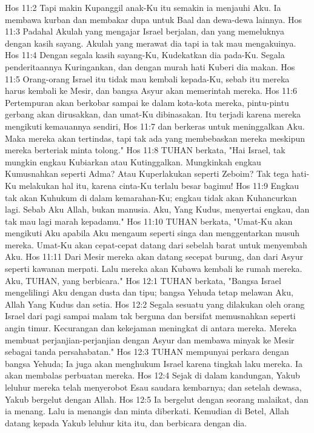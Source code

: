 Hos 11:2  Tapi makin Kupanggil anak-Ku itu semakin ia menjauhi Aku. Ia membawa kurban dan membakar dupa untuk Baal dan dewa-dewa lainnya.
Hos 11:3  Padahal Akulah yang mengajar Israel berjalan, dan yang memeluknya dengan kasih sayang. Akulah yang merawat dia tapi ia tak mau mengakuinya.
Hos 11:4  Dengan segala kasih sayang-Ku, Kudekatkan dia pada-Ku. Segala penderitaannya Kuringankan, dan dengan murah hati Kuberi dia makan.
Hos 11:5  Orang-orang Israel itu tidak mau kembali kepada-Ku, sebab itu mereka harus kembali ke Mesir, dan bangsa Asyur akan memerintah mereka.
Hos 11:6  Pertempuran akan berkobar sampai ke dalam kota-kota mereka, pintu-pintu gerbang akan dirusakkan, dan umat-Ku dibinasakan. Itu terjadi karena mereka mengikuti kemauannya sendiri,
Hos 11:7  dan berkeras untuk meninggalkan Aku. Maka mereka akan tertindas, tapi tak ada yang membebaskan mereka meskipun mereka berteriak minta tolong."
Hos 11:8  TUHAN berkata, "Hai Israel, tak mungkin engkau Kubiarkan atau Kutinggalkan. Mungkinkah engkau Kumusnahkan seperti Adma? Atau Kuperlakukan seperti Zeboim? Tak tega hati-Ku melakukan hal itu, karena cinta-Ku terlalu besar bagimu!
Hos 11:9  Engkau tak akan Kuhukum di dalam kemarahan-Ku; engkau tidak akan Kuhancurkan lagi. Sebab Aku Allah, bukan manusia. Aku, Yang Kudus, menyertai engkau, dan tak mau lagi marah kepadamu."
Hos 11:10  TUHAN berkata, "Umat-Ku akan mengikuti Aku apabila Aku mengaum seperti singa dan menggentarkan musuh mereka. Umat-Ku akan cepat-cepat datang dari sebelah barat untuk menyembah Aku.
Hos 11:11  Dari Mesir mereka akan datang secepat burung, dan dari Asyur seperti kawanan merpati. Lalu mereka akan Kubawa kembali ke rumah mereka. Aku, TUHAN, yang berbicara."
Hos 12:1  TUHAN berkata, "Bangsa Israel mengelilingi Aku dengan dusta dan tipu; bangsa Yehuda tetap melawan Aku, Allah Yang Kudus dan setia.
Hos 12:2  Segala sesuatu yang dilakukan oleh orang Israel dari pagi sampai malam tak berguna dan bersifat memusnahkan seperti angin timur. Kecurangan dan kekejaman meningkat di antara mereka. Mereka membuat perjanjian-perjanjian dengan Asyur dan membawa minyak ke Mesir sebagai tanda persahabatan."
Hos 12:3  TUHAN mempunyai perkara dengan bangsa Yehuda; Ia juga akan menghukum Israel karena tingkah laku mereka. Ia akan membalas perbuatan mereka.
Hos 12:4  Sejak di dalam kandungan, Yakub leluhur mereka telah menyerobot Esau saudara kembarnya; dan setelah dewasa, Yakub bergelut dengan Allah.
Hos 12:5  Ia bergelut dengan seorang malaikat, dan ia menang. Lalu ia menangis dan minta diberkati. Kemudian di Betel, Allah datang kepada Yakub leluhur kita itu, dan berbicara dengan dia.
